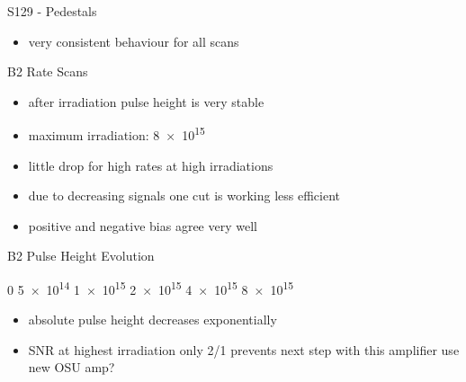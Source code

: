 \begin{frame}{S129 - Pedestals}

	\vspace*{-2ex}
	
	\begin{itemize}\itemfill
		\item very consistent behaviour for all scans
	\end{itemize}

\end{frame}
\begin{frame}{B2 Rate Scans}

	\begin{minipage}[c][.7\textheight]{.34\textwidth}
		\begin{itemize}\itemfill
			\item after irradiation pulse height is very stable
			\item maximum irradiation: \SI{8e15}{\ncm}
			\item little drop for high rates at high irradiations 
			\item \ra due to decreasing signals one cut is working less efficient
			\item<2> positive and negative bias agree very well
		\end{itemize}
	\end{minipage}\hfill
	\begin{minipage}{.63\textwidth}
	\end{minipage}
	
\end{frame}
\begin{frame}{B2 Pulse Height Evolution}

	\vspace*{-3ex}

	\def\d{\hspace*{1ex}}
	\hspace*{17ex} 0 \d\ra\d \SI{5e14}{} \d\ra\d \SI{1e15}{} \d\ra\d \SI{2e15}{} \ra \SI{4e15}{} \ra \SI{8e15}{\ncm}\vspace*{3ex}
	\begin{itemize}\itemfill
		\item absolute pulse height decreases exponentially
		\item SNR at highest irradiation only 2/1 \ra prevents next step with this amplifier \ra use new OSU amp?
	\end{itemize}

\end{frame}
